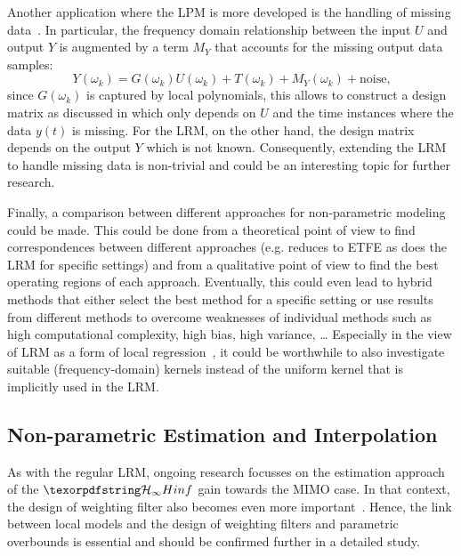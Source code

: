     Another application where the \gls{LPM} is more developed is the handling of missing data~\citep{Ugryumova2015}.
    In particular, the frequency domain relationship between the input $U$ and output $Y$ is augmented by a term $M_Y$ that accounts for the missing output data samples:
    \begin{equation}
      Y(\omega_k) = G(\omega_k) U(\omega_k) + T(\omega_k) + M_Y(\omega_k) + \mathrm{noise}\text{,}
    \end{equation}
    since $G(\omega_k)$ is captured by local polynomials, this allows to construct a design matrix as discussed in  which only depends on $U$ and the time instances where the data $y(t)$ is missing.
    For the \gls{LRM}, on the other hand, the design matrix depends on the output $Y$ which is not known.
    Consequently, extending the \gls{LRM} to handle missing data is non-trivial and could be an interesting topic for further research.

    Finally, a comparison between different approaches for non-parametric modeling~\citep{Hagg2012,Stenman2001ASFRF,Gevers2011lpm} could be made.
    This could be done from a theoretical point of view to find correspondences between different approaches (e.g. \citep{Hagg2012} reduces to \gls{ETFE} as does the \gls{LRM} for specific settings) and from a qualitative point of view to find the best operating regions of each approach.
    Eventually, this could even lead to hybrid methods that either select the best method for a specific setting or use results from different methods to overcome weaknesses of individual methods such as high computational complexity, high bias, high variance, \ldots
    Especially in the view of \gls{LRM} as a form of local regression~\citep{Loader1999}, it could be worthwhile to also investigate suitable (frequency-domain) kernels instead of the uniform kernel that is implicitly used in the \gls{LRM}.

  \subsection{Non-parametric Estimation and Interpolation}
  As with the regular \gls{LRM}, ongoing research focusses on the estimation approach of the $\Hinf{}$ gain towards the \gls{MIMO} case.
  In that context, the design of weighting filter also becomes even more important~\citep{Boeren2013}.
  Hence, the link between local models and the design of weighting filters and parametric overbounds is essential and should be confirmed further in a detailed study.


